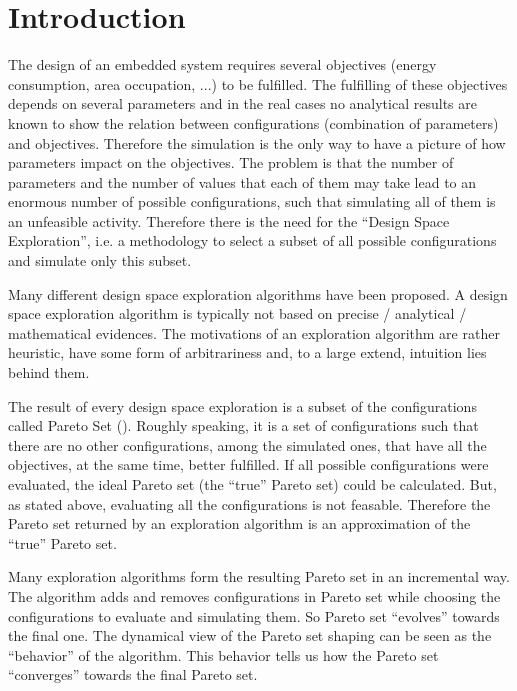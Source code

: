 
\section{Introduction}

The design of an embedded system requires several objectives (energy
consumption, area occupation, ...) to be fulfilled. The fulfilling
of these objectives depends on several parameters and in the real
cases no analytical results are known to show the relation between
configurations (combination of parameters) and objectives. Therefore
the simulation is the only way to have a picture of how parameters
impact on the objectives. The problem is that the number of parameters
and the number of values that each of them may take lead to an enormous
number of possible configurations, such that simulating all of them
is an unfeasible activity. Therefore there is the need for the ``Design
Space Exploration'', i.e. a methodology to select a subset of all
possible configurations and simulate only this subset.

Many different design space exploration algorithms have been proposed.
A design space exploration algorithm is typically not based on precise
/ analytical / mathematical evidences. The motivations of an exploration
algorithm are rather heuristic, have some form of arbitrariness and,
to a large extend, intuition lies behind them.



The result of every design space exploration is a subset of the configurations
called Pareto Set (\cite{pareto}). Roughly speaking, it is a set of
configurations such that there are no other configurations, among
the simulated ones, that have all the objectives, at the same time,
better fulfilled. If all possible configurations were evaluated, the
ideal Pareto set (the ``true'' Pareto set) could be calculated.
But, as stated above, evaluating all the configurations is not feasable.
Therefore the Pareto set returned by an exploration algorithm is an
approximation of the ``true'' Pareto set.

Many exploration algorithms form the resulting Pareto set in an incremental
way. The algorithm adds and removes configurations in Pareto set while
choosing the configurations to evaluate and simulating them. So Pareto
set ``evolves'' towards the final one. The dynamical view of the
Pareto set shaping can be seen as the ``behavior'' of the algorithm.
This behavior tells us how the Pareto set ``converges'' towards
the final Pareto set. 

